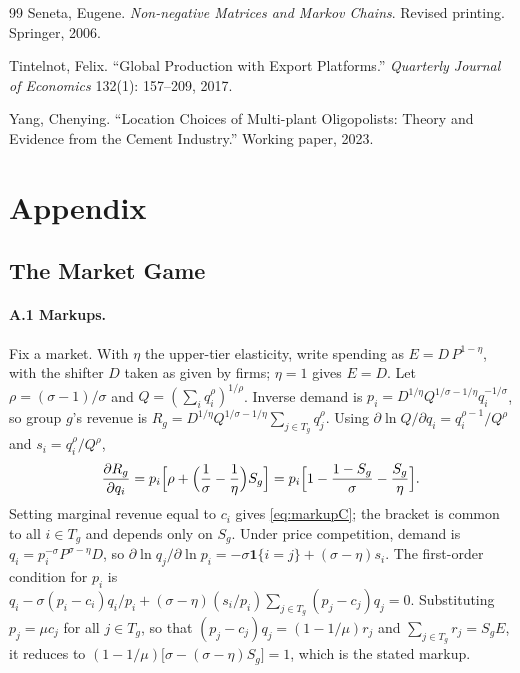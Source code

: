 \documentclass[11pt]{article}
\theoremstyle{definition}
\theoremstyle{remark}
\begin{document}
\begin{thebibliography}{99}
Seneta, Eugene. \emph{Non-negative Matrices and Markov Chains}. Revised printing.
Springer, 2006.

Tintelnot, Felix. ``Global Production with Export Platforms.'' \emph{Quarterly Journal
of Economics} 132(1): 157--209, 2017.

Yang, Chenying. ``Location Choices of Multi-plant Oligopolists: Theory and Evidence
from the Cement Industry.'' Working paper, 2023.

\end{thebibliography}

\newpage
\section*{Appendix}
\renewcommand{\theHsubsection}{app.\Alph{subsection}}
\renewcommand{\theHequation}{app.\arabic{equation}}
\setcounter{subsection}{0}
\setcounter{equation}{0}
\renewcommand{\theequation}{A.\arabic{equation}}

\renewcommand{\thesubsection}{\Alph{subsection}}

\subsection{The Market Game}
\label{app:market}

\paragraph{A.1 Markups.} Fix a market. With $\eta$ the upper-tier elasticity, write
spending as $E=D\,P^{1-\eta}$, with the shifter $D$ taken as given by firms; $\eta=1$
gives $E=D$. Let $\rho=(\sigma-1)/\sigma$ and $Q=(\sum_iq_i^{\rho})^{1/\rho}$. Inverse
demand is $p_i=D^{1/\eta}Q^{1/\sigma-1/\eta}q_i^{-1/\sigma}$, so group $g$'s revenue is
$R_g=D^{1/\eta}Q^{1/\sigma-1/\eta}\sum_{j\in T_g}q_j^{\rho}$. Using
$\partial\ln Q/\partial q_i=q_i^{\rho-1}/Q^{\rho}$ and $s_i=q_i^\rho/Q^\rho$,
\[
  \frac{\partial R_g}{\partial q_i}
  =p_i\Bigl[\rho+\Bigl(\frac1\sigma-\frac1\eta\Bigr)S_g\Bigr]
  =p_i\Bigl[1-\frac{1-S_g}{\sigma}-\frac{S_g}{\eta}\Bigr].
\]
Setting marginal revenue equal to $c_i$ gives \eqref{eq:markupC}; the bracket is common
to all $i\in T_g$ and depends only on $S_g$. Under price competition, demand is
$q_i=p_i^{-\sigma}P^{\sigma-\eta}D$, so
$\partial\ln q_j/\partial\ln p_i=-\sigma\mathbf 1\{i=j\}+(\sigma-\eta)s_i$. The
first-order condition for $p_i$ is
$q_i-\sigma(p_i-c_i)q_i/p_i+(\sigma-\eta)(s_i/p_i)\sum_{j\in T_g}(p_j-c_j)q_j=0$. Substituting
$p_j=\mu c_j$ for all $j\in T_g$, so that $(p_j-c_j)q_j=(1-1/\mu)r_j$ and
$\sum_{j\in T_g}r_j=S_gE$, it reduces to
$(1-1/\mu)\bigl[\sigma-(\sigma-\eta)S_g\bigr]=1$, which is the stated markup.
\end{document}
